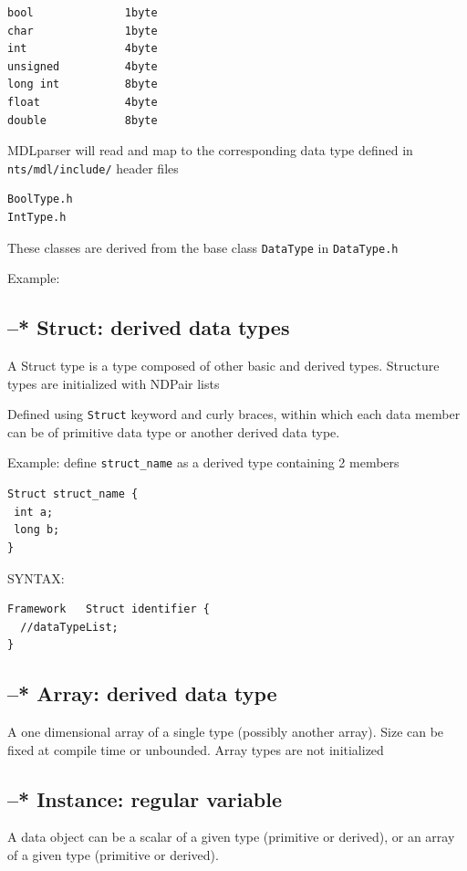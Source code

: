 \begin{verbatim}
bool              1byte
char              1byte
int               4byte
unsigned          4byte
long int          8byte
float             4byte
double            8byte
\end{verbatim}


MDLparser will read and map to the corresponding data type defined in 
\verb!nts/mdl/include/! header files
\begin{verbatim}
BoolType.h
IntType.h
\end{verbatim}
These classes are derived from the base class \verb!DataType!
in \verb!DataType.h!


Example:
	

\subsection{--* Struct: derived data types}
\label{sec:MDL-data-types-struct}

A Struct type is a type composed of other basic and derived types. 
Structure types are initialized with NDPair lists


Defined using \verb!Struct! keyword and curly braces, within which each data
member can be of primitive data type or another derived data type.

Example: define \verb!struct_name! as a derived type containing 2 members
\begin{verbatim}
Struct struct_name {
 int a;
 long b;
}
\end{verbatim}


SYNTAX:
\begin{verbatim}
Framework   Struct identifier {
  //dataTypeList;
}
\end{verbatim}

\subsection{--* Array: derived data type}
\label{sec:MDL-data-types-array}

A one dimensional array of a single type (possibly another array). Size can be
fixed at compile time or unbounded. Array types are not initialized


\subsection{--* Instance: regular variable}

A data object can be a scalar of a given type (primitive or derived), or
an array of a given type (primitive or derived).

